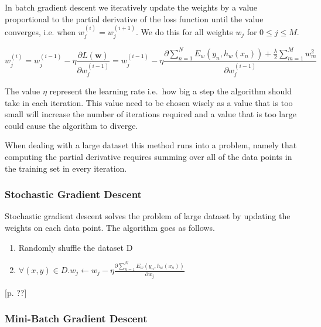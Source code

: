 In batch gradient descent we iteratively update the weights by a value proportional to the partial derivative of the loss function until the value converges, i.e. when $w_{j}^{(i)} = w_j^{(i+1)}$.
We do this for all weights $w_j$ for $0 \leq j \leq M$.


\[ w_j^{(i)} = w_j^{(i-1)} - \eta \frac{\partial L(\textbf{w})}{\partial w_j^{(i-1)}}
       = w_{j}^{(i-1)} - \eta \frac{\partial \sum_{n=1}^N E_w(y_n, h_w(x_n)) + \frac{\lambda}{2}\sum_{m=1}^M w_m^2}{\partial w_j^{(i-1)}} \]  

The value $\eta$ represent the learning rate i.e.\ how big a step the algorithm should take in each iteration.
This value need to be chosen wisely as a value that is too small will increase the number of iterations required and a value that is too large could cause the algorithm to diverge.

When dealing with a large dataset this method runs into a problem, namely that computing the partial derivative requires summing over all of the data points in the training set in every iteration. 

\subsubsection{Stochastic Gradient Descent}\label{sec:stochastic}

Stochastic gradient descent solves the problem of large dataset by updating the weights on each data point.
The algorithm goes as follows.

\begin{enumerate}
\item Randomly shuffle the dataset D \\
\item $\forall (x,y) \in D. w_j \leftarrow w_j - \eta \frac{\partial \sum_{n=1}^N E_w(y_n, h_w(x_n))}{ \partial w_j}$  \\
\end{enumerate}


\begin{flushright}
\cite{Bishop2006}[p. ??]
\end{flushright}


\subsubsection{Mini-Batch Gradient Descent}\label{sec:mini-batch}


